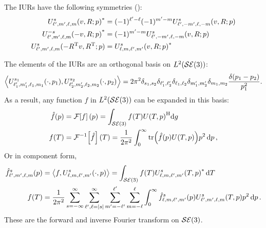 \documentclass[../../main.tex]{subfiles}
\begin{document}
\begin{refsection}
	The IURs have the following symmetries (\cite[Eqs. 10.39-10.41]{chirikjianHarmonicAnalysisEngineers2016}):
	\begin{align}
		{U^{s}_{\ell',m',\ell,m}(v, R; p)}^*             & = (-1)^{\ell'-\ell} (-1)^{m'-m} U^{s}_{\ell',-m',\ell,-m}(v, R; p) \\
		{U^{-s}_{\ell',m',\ell,m}(-v, R; p)}^*           & = (-1)^{m'-m} U^{s}_{\ell',-m',\ell,-m}(v, R; p)                   \\
		U^{s}_{\ell',m',\ell,m}(-{R}^\mathrm{T} v, {R}^\mathrm{T}; p) & = {U^{s}_{\ell,m,\ell',m'}(v, R; p)}^*
	\end{align}

	The elements of the IURs are an orthogonal basis on $L^2(\mathcal{SE} (3))$:
	\begin{equation} \label{iurse3orthog}
		\left\langle  U^{s_1}_{\ell_1',m_1',\ell_1,m_1}(\cdot, p_1) ,  U^{s_2}_{\ell_2',m_2',\ell_2,m_2}(\cdot, p_2)  \right\rangle = 2 \pi^2 \delta_{s_1,s_2} \delta_{\ell_1',\ell_2'} \delta_{\ell_1,\ell_2} \delta_{m_1',m_2'} \delta_{m_1,m_2} \frac{\delta(p_1 - p_2)}{p_1^2}.
	\end{equation}
	As a result, any function $f$ in $L^2(\mathcal{SE} (3))$ can be expanded in this basis:
	\begin{align}\label{se3_fourier}
		\hat{f}(p) & = \mathcal{F}\qty[f](p) = \int_{\mathcal{SE} (3)} f(T) {U(T, p)}^\mathrm{H} \dd g                                           \\
		f(T)        & = \mathcal{F}^{-1}\qty[\hat{f}](T) = \frac{1}{2 \pi^2} \int_{0}^\infty \tr( \hat{f}(p) U(T, p) ) p^2 \dd{p},
	\end{align}
	Or in component form,
	\begin{align}\label{se3_fourier_component}
		\hat{f}^s_{\ell',m',\ell,m}(p)
		 & = \left\langle f, U^s_{\ell,m,\ell',m'}(\cdot, p) \right\rangle = \int_{\mathcal{SE} (3)} f(T) {U^s_{\ell,m,\ell',m'}(T, p)}^* \dd{T}                                                                                                     \\
		f(T)
		 & = \frac{1}{2 \pi^2} \sum_{s=-\infty}^\infty \sum_{\ell',\ell=|s|}^\infty \sum_{m'=-\ell'}^{\ell'} \sum_{m=-\ell}^{\ell} \int_{0}^\infty \hat{f}^s_{\ell,m,\ell',m'}(p) U^s_{\ell',m',\ell,m}(T, p) p^2 \dd{p}.
	\end{align}
	These are the forward and inverse Fourier transform on $\mathcal{SE} (3)$.


\end{refsection}
\end{document}
